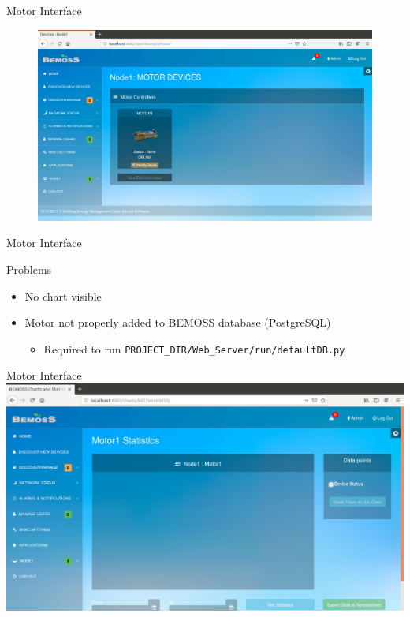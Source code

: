 \documentclass{beamer}
\begin{document}
\begin{frame}{Motor Interface}
\begin{figure}
\centering
\includegraphics[scale=0.25]{figs/motordevices.png}
\end{figure}

\end{frame}

\begin{frame}{Motor Interface}
\begin{block}{Problems}
\begin{itemize}
\item No chart visible
\item Motor not properly added to BEMOSS database (PostgreSQL)
\begin{itemize}
\item Required to run \texttt{PROJECT\_DIR/Web\_Server/run/defaultDB.py}
\end{itemize}
\end{itemize}
\end{block}
\end{frame}

\begin{frame}{Motor Interface}
\includegraphics[scale=0.25]{figs/nomotorchart.png}
\end{frame}
\end{document}
